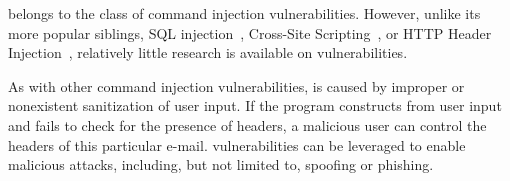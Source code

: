 \ehi belongs to the class of command injection vulnerabilities. However, unlike its more popular siblings, SQL injection~\cite{sql1, sql0, sql2}, Cross-Site Scripting~\cite{Injection1, KleinAmit}, or HTTP Header Injection~\cite{sessionride}, relatively little research is available on \ehi vulnerabilities.

As with other command injection vulnerabilities, \ehi is caused by
improper or nonexistent sanitization of user input. If the program
constructs \emails from user input and fails to check for the presence
of \email headers, a malicious user can control the headers of this particular e-mail. \ehi vulnerabilities can be leveraged to enable malicious attacks, including, but not limited to, spoofing or phishing.
